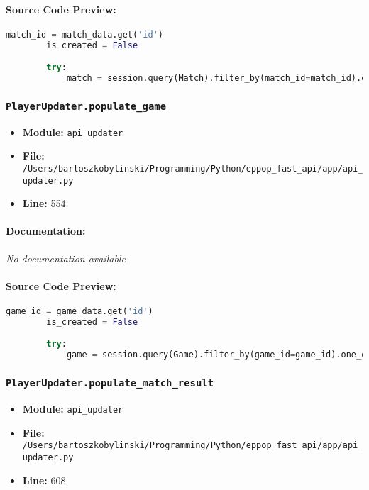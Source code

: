 \documentclass[11pt,a4paper]{article}
\begin{document}
\paragraph{Source Code Preview:}
\begin{lstlisting}[language=Python]
        match_id = match_data.get('id')
        is_created = False

        try:
            match = session.query(Match).filter_by(match_id=match_id).one_or_none()
\end{lstlisting}

\vspace{1em}
\subsubsection{\texttt{PlayerUpdater.populate\_game}}

\begin{itemize}
    \item \textbf{Module:} \texttt{api\_updater}
    \item \textbf{File:} \texttt{/Users/bartoszkobylinski/Programming/Python/eppop\_fast\_api/app/api\_updater.py}
    \item \textbf{Line:} 554
\end{itemize}

\paragraph{Documentation:} \textit{No documentation available}

\paragraph{Source Code Preview:}
\begin{lstlisting}[language=Python]
        game_id = game_data.get('id')
        is_created = False

        try:
            game = session.query(Game).filter_by(game_id=game_id).one_or_none()
\end{lstlisting}

\vspace{1em}
\subsubsection{\texttt{PlayerUpdater.populate\_match\_result}}

\begin{itemize}
    \item \textbf{Module:} \texttt{api\_updater}
    \item \textbf{File:} \texttt{/Users/bartoszkobylinski/Programming/Python/eppop\_fast\_api/app/api\_updater.py}
    \item \textbf{Line:} 608
\end{itemize}
\end{document}
